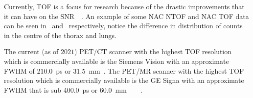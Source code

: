                 Currently, \gls{TOF} is a focus for research because of the drastic improvements that it can have on the \gls{SNR}~~. %
                An example of some \gls{NAC} \gls{NTOF} and \gls{NAC} \gls{TOF} data can be seen in~ and~ respectively, notice the difference in distribution of counts in the centre of the thorax and lungs.
                
                The current (as of $2021$) \gls{PET}/\gls{CT} scanner with the highest \gls{TOF} resolution which is commercially available is the Siemens Vision with an approximate \gls{FWHM} of \SI{210.0}{\pico\second} or \SI{31.5}{\milli\metre}~. The \gls{PET}/\gls{MR} scanner with the highest \gls{TOF} resolution which is commercially available is the \gls{GE} Signa with an approximate \gls{FWHM} that is sub \SI{400.0}{\pico\second} or \SI{60.0}{\milli\metre}~~~~. %
            

